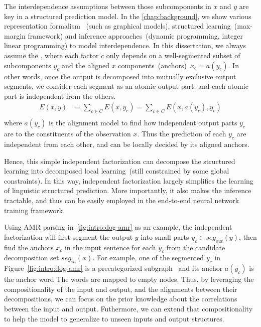 The interdependence assumptions between those subcomponents in $x$
and $y$ are key in a structured prediction model. In the
\autoref{chap:background}, we show various representation formalism
~(such as graphical models), structured learning~(max-margin
framework) and inference approaches~(dynamic programming, integer
linear programming) to model interdependence. In this dissertation, we
always assume the , where each factor
$c$ only depends on a well-segmented subset of subcomponents $y_{c}$
and the aligned $x$ components~(anchors)~$x_{c}=a(y_{c})$. In other
words, once the output is decomposed into mutually exclusive output
segments, we consider each segment as an atomic output part, and each
atomic part is independent from the others.
\begin{equation}
    \label{eq:independent-factor}
    \begin{split}
    E(x, y) & =\sum_{c \in C} E(x, y_{c}) = \sum_{c \in C}E(x, a(y_{c}), y_{c})  \\
    \end{split}
\end{equation}
where $a(y_{c})$ is the alignment model to find how independent output
parts $y_{c}$ are  to the constituents of the observation
$x$. Thus the prediction of each $y_{c}$ are independent from each
other, and can be locally decided by its aligned anchors.

Hence, this simple independent factorization can decompose the
structured learning into decomposed local learning~(still constrained
by some global constraints). In this way, independent factorization
largely simplifies the learning of linguistic structured
prediction. More importantly, it also makes the inference tractable,
and thus can be easily employed in the end-to-end neural network
training framework.

Using AMR parsing in~\autoref{fig:intro:dog-amr} as an example, the
independent factorization will first segment the output $y$ into small
parts $y_{c} \in seg_{out}(y)$, then find the anchors $x_{c}$ in the
input sentence for each $y_{c}$ from the candidate decomposition set
$seg_{in}(x)$. For example, one of the segmented $y_{c}$ in
Figure~\ref{fig:intro:dog-amr} is a precategorized subgraph
~and its anchor $a(y_{c})$ is the
anchor word  The words  
are mapped to empty nodes.  Thus, by leveraging the compositionality
of the input and output, and the alignments between their
decompositions, we can focus on the prior knowledge about the
correlations between the input and output. Futhermore, we can extend
that compositionality to help the model to generalize to unseen inputs
and output structures.

